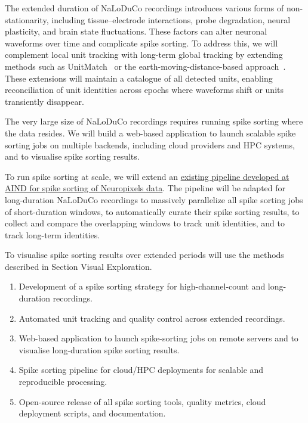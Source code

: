 
The extended duration of NaLoDuCo recordings introduces various forms of
non-stationarity, including tissue–electrode interactions, probe degradation,
neural plasticity, and brain state fluctuations. These factors can alter
neuronal waveforms over time and complicate spike sorting. To address this, we
will complement local unit tracking with long-term global tracking by extending
methods such as UnitMatch~\cite{vanBeestEtAl24} or the earth-moving-distance-based
approach~\cite{yuanEtAl24}. These extensions will maintain a catalogue of all
detected units, enabling reconciliation of unit identities across epochs where
waveforms shift or units transiently disappear.


The very large size of NaLoDuCo recordings requires running spike sorting where
the data resides. We will build a web-based application to launch scalable
spike sorting jobs on multiple backends, including cloud providers and HPC
systems, and to visualise spike sorting results.

To run spike sorting at scale, we will extend an
\href{https://github.com/AllenNeuralDynamics/aind-ephys-pipeline}{existing
pipeline developed at AIND for spike sorting of Neuropixels data}. The pipeline
will be adapted for long-duration NaLoDuCo recordings to massively parallelize
all spike sorting jobs of short-duration windows, to automatically curate their
spike sorting results, to collect and compare the overlapping windows to track
unit identities, and to track long-term identities.

To visualise spike sorting results over extended periods will use the methods
described in Section Visual Exploration.


\begin{enumerate}

	\item Development of a spike sorting strategy for high-channel-count and long-duration recordings.

	\item Automated unit tracking and quality control across extended recordings.

	\item Web-based application to launch spike-sorting jobs on remote servers and to visualise long-duration spike sorting results.

	\item Spike sorting pipeline for cloud/HPC deployments for scalable and reproducible processing.

	\item Open-source release of all spike sorting tools, quality metrics, cloud deployment scripts, and documentation.

\end{enumerate}

